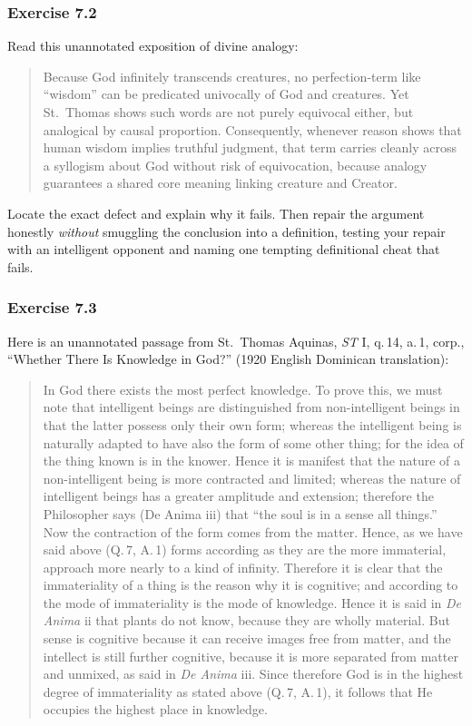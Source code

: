 \subsubsection*{Exercise 7.2}
Read this unannotated exposition of divine analogy:

\begin{quote}
Because God infinitely transcends creatures, no perfection-term like ``wisdom'' can be predicated univocally of God and creatures. Yet St.\ Thomas shows such words are not purely equivocal either, but analogical by causal proportion. Consequently, whenever reason shows that human wisdom implies truthful judgment, that term carries cleanly across a syllogism about God without risk of equivocation, because analogy guarantees a shared core meaning linking creature and Creator.
\end{quote}

Locate the exact defect and explain why it fails. Then repair the argument honestly \emph{without} smuggling the conclusion into a definition, testing your repair with an intelligent opponent and naming one tempting definitional cheat that fails.

\subsubsection*{Exercise 7.3}
Here is an unannotated passage from St.\ Thomas Aquinas, \emph{ST} I, q.\,14, a.\,1, corp., ``Whether There Is Knowledge in God?'' (1920 English Dominican translation):

\begin{quote}
In God there exists the most perfect knowledge. To prove this, we must note that intelligent beings are distinguished from non-intelligent beings in that the latter possess only their own form; whereas the intelligent being is naturally adapted to have also the form of some other thing; for the idea of the thing known is in the knower. Hence it is manifest that the nature of a non-intelligent being is more contracted and limited; whereas the nature of intelligent beings has a greater amplitude and extension; therefore the Philosopher says (De Anima iii) that ``the soul is in a sense all things.'' Now the contraction of the form comes from the matter. Hence, as we have said above (Q.\,7, A.\,1) forms according as they are the more immaterial, approach more nearly to a kind of infinity. Therefore it is clear that the immateriality of a thing is the reason why it is cognitive; and according to the mode of immateriality is the mode of knowledge. Hence it is said in \emph{De Anima} ii that plants do not know, because they are wholly material. But sense is cognitive because it can receive images free from matter, and the intellect is still further cognitive, because it is more separated from matter and unmixed, as said in \emph{De Anima} iii. Since therefore God is in the highest degree of immateriality as stated above (Q.\,7, A.\,1), it follows that He occupies the highest place in knowledge.
\end{quote}

